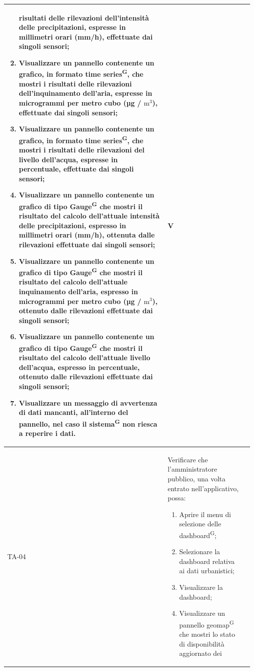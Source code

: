 \documentclass[8pt]{article}
\newcommand{\glossterm}[1]{#1\textsuperscript{G}} %
\begin{document}
\begin{longtable}{|>{\centering}p{2cm}|>{\RaggedRight}m{12cm}|>{\centering\arraybackslash}p{2cm}|}
\begin{enumerate}[start=8]
            risultati delle rilevazioni dell’intensità delle precipitazioni, espresse in millimetri orari (mm/h), effettuate dai
            singoli sensori;
        \item Visualizzare un pannello contenente un grafico, in formato \glossterm{time series}, che mostri i
            risultati delle rilevazioni dell’inquinamento dell'aria, espresse in microgrammi per metro cubo (µg / $\mbox{m}^{\mbox{3}}$), effettuate dai
            singoli sensori;
        \item Visualizzare un pannello contenente un grafico, in formato \glossterm{time series}, che mostri i
            risultati delle rilevazioni del livello dell'acqua, espresse in percentuale, effettuate dai
            singoli sensori;
        \item Visualizzare un pannello contenente un grafico di tipo \glossterm{Gauge} che mostri il risultato
            del calcolo dell'attuale intensità delle precipitazioni, espresso in millimetri orari (mm/h), ottenuta dalle rilevazioni effettuate dai singoli sensori;
        \item Visualizzare un pannello contenente un grafico di tipo \glossterm{Gauge} che mostri il risultato
            del calcolo dell'attuale inquinamento dell'aria, espresso in microgrammi per metro cubo (µg / $\mbox{m}^{\mbox{3}}$), ottenuto dalle rilevazioni effettuate dai singoli sensori;
        \item Visualizzare un pannello contenente un grafico di tipo \glossterm{Gauge} che mostri il risultato
            del calcolo dell'attuale livello dell'acqua, espresso in percentuale, ottenuto dalle rilevazioni effettuate dai singoli sensori;
        \item Visualizzare un messaggio di avvertenza di dati mancanti, all’interno del pannello, nel caso il \glossterm{sistema} non riesca a reperire i dati.
    \end{enumerate}
    & V \\
    \hline
    TA-04 & Verificare che l'amministratore pubblico, una volta entrato nell'applicativo, possa:
    \begin{enumerate}
        \setlength\itemsep{0em}
        \item Aprire il menu di selezione delle \glossterm{dashboard};
        \item Selezionare la dashboard relativa ai dati urbanistici;
        \item Visualizzare la dashboard;
        \item Visualizzare un pannello \glossterm{geomap} che mostri lo stato di disponibilità aggiornato dei

\end{enumerate}
\end{longtable}
\end{document}
